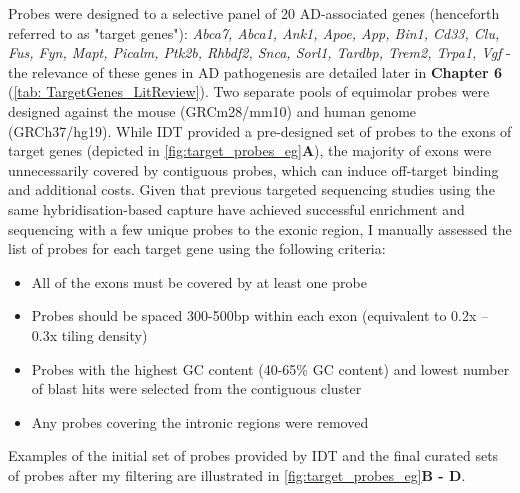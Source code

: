 
Probes were designed to a selective panel of 20 AD-associated genes (henceforth referred to as "target genes"): \textit{Abca7, Abca1, Ank1, Apoe, App, Bin1, Cd33, Clu, Fus, Fyn, Mapt, Picalm, Ptk2b, Rhbdf2, Snca, Sorl1, Tardbp, Trem2, Trpa1, Vgf} - the relevance of these genes in AD pathogenesis are detailed later in \textbf{Chapter 6} (\cref{tab: TargetGenes_LitReview}). Two separate pools of equimolar probes were designed against the mouse (GRCm28/mm10) and human genome (GRCh37/hg19). While IDT provided a pre-designed set of probes to the exons of target genes (depicted in \cref{fig:target_probes_eg}\textbf{A}), the majority of exons were unnecessarily covered by contiguous probes, which can induce off-target binding and additional costs. Given that previous targeted sequencing studies using the same hybridisation-based capture have achieved successful enrichment and sequencing with a few unique probes to the exonic region\cite{Sheynkman2020}, I manually assessed the list of probes for each target gene using the following criteria:
\begin{itemize}
	\item All of the exons must be covered by at least one probe
	\item Probes should be spaced 300-500bp within each exon (equivalent to 0.2x – 0.3x tiling density) 
	\item Probes with the highest GC content (40-65\% GC content) and lowest number of blast hits were selected from the contiguous cluster 
	\item Any probes covering the intronic regions were removed
\end{itemize}
Examples of the initial set of probes provided by IDT and the final curated sets of probes after my filtering are illustrated in  \cref{fig:target_probes_eg}\textbf{B - D}. 

